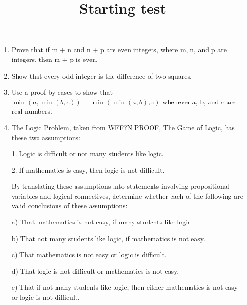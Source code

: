 \documentclass[11pt, oneside]{article}   	%
\title{Starting test}
\author{}
\begin{document}
\maketitle
\begin{enumerate}


\item Prove that if m + n and n + p are even integers, where m, n, and p are integers, then m + p is even. 


\item Show that every odd integer is the difference of two squares.

\item Use a proof by cases to show that $\min(a, \min(b, c)) = \min(\min(a, b), c)$ whenever a, b, and c are real numbers.



\item The Logic Problem, taken from WFF?N PROOF, The Game of Logic, has these two assumptions:

1. Logic is difficult or not many students like logic.

2. If mathematics is easy, then logic is not difficult.

 By translating these assumptions into statements involving propositional variables and logical connectives, determine whether each of the following are valid conclusions of these assumptions:

a) That mathematics is not easy, if many students like logic.
 
b) That not many students like logic, if mathematics is not easy.
 
c) That mathematics is not easy or logic is difficult.
 
d) That logic is not difficult or mathematics is not easy.

e) That if not many students like logic, then either mathematics is not easy or logic is not difficult.
\end{enumerate}
\end{document}
